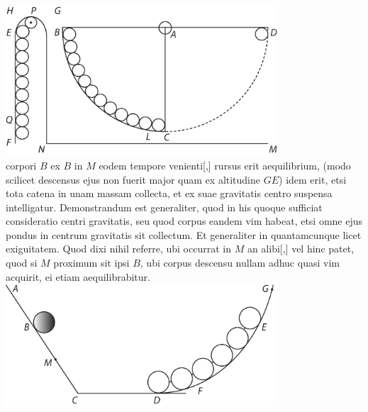 \pstart
\noindent
\centering
\includegraphics[trim = 0mm -3mm 0mm 0mm, clip, width=0.76\textwidth]{images/LH037,04_061r-d1.pdf}\\
\noindent {} 
\pend
\vspace{2em}
\pstart \noindent corpori $\displaystyle B$
ex $\displaystyle B$ in $\displaystyle M$ eodem tempore venienti[,]
rursus erit aequilibrium\protect{},
(modo scilicet descensus\protect{} ejus non fuerit major quam ex altitudine $\displaystyle GE$)
idem erit, etsi tota catena\protect{} in unam massam\protect{} collecta,
et ex suae gravitatis centro\protect{} suspensa intelligatur.
\pend
\pstart
Demonstrandum est generaliter,
quod in his quoque sufficiat consideratio centri gravitatis\protect{},
seu quod corpus eandem vim habeat,
etsi omne ejus pondus\protect{} in centrum gravitatis\protect{} sit collectum.
Et generaliter in quantamcunque licet exiguitatem.
Quod dixi nihil referre, ubi occurrat in $\displaystyle M$ an alibi[,]
vel hinc patet, quod si $\displaystyle M$ proximum sit ipsi $\displaystyle B$,
ubi corpus descensu\protect{} nullam adhuc quasi vim acquirit, ei etiam aequilibrabitur.
\pend
\vspace{2em}
\pstart
\noindent
\centering
\includegraphics[trim = 0mm -3mm 0mm 0mm, clip, width=0.75\textwidth]{images/LH037,04_061r-d2.pdf}\\

